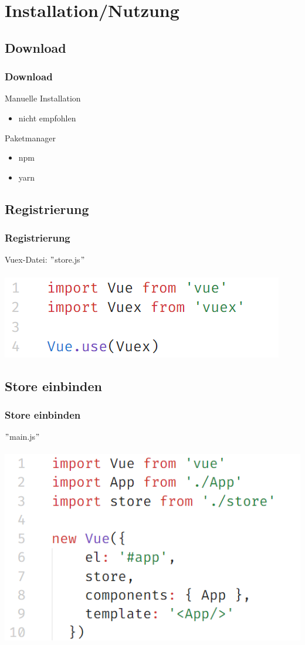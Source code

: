 \documentclass{beamer}
\begin{document}
\section{Installation/Nutzung}
\subsection{Download}
\begin{frame}[fragile]
    \frametitle{Download}
    Manuelle Installation
    \begin{itemize}
        \item nicht empfohlen
    \end{itemize}
    Paketmanager
    \begin{itemize}
        \item npm
        \item yarn
    \end{itemize}
\end{frame}
\subsection{Registrierung}
\begin{frame}
    \frametitle{Registrierung}
    Vuex-Datei: $"$store.js$"$ \\~\\
    \includegraphics[scale=0.4]{registrierung.png}
\end{frame}
\subsection{Store einbinden}
\begin{frame}
    \frametitle{Store einbinden}
    $"$main.js$"$ \\~\\
    \includegraphics[scale=0.4]{einbinden.png}
\end{frame}
\end{document}
